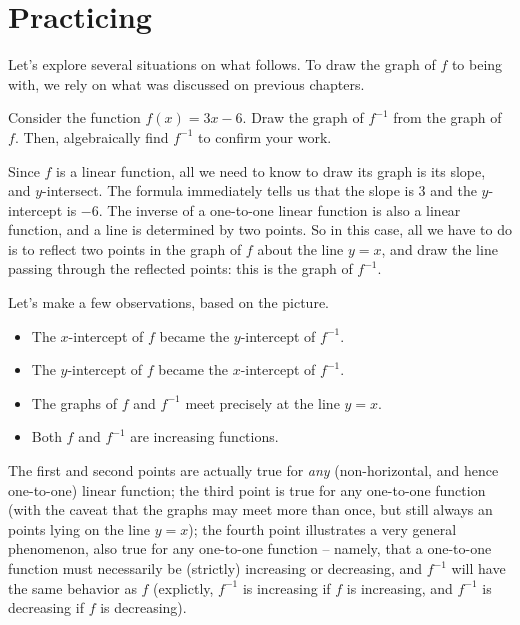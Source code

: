 \documentclass[nooutcomes]{ximera}
\begin{document}
\section{Practicing}

Let's explore several situations on what follows. To draw the graph of $f$ to being with, we rely on what was discussed on previous chapters.

\begin{example}
  Consider the function $f(x)=3x-6$. Draw the graph of $f^{-1}$ from the graph of $f$. Then, algebraically find $f^{-1}$ to confirm your work.
  
  \begin{explanation}
    Since $f$ is a linear function, all we need to know to draw its graph is its slope, and $y$-intersect. The formula immediately tells us that the slope is $3$ and the $y$-intercept is $-6$. The inverse of a one-to-one linear function is also a linear function, and a line is determined by two points. So in this case, all we have to do is to reflect two points in the graph of $f$ about the line $y=x$, and draw the line passing through the reflected points: this is the graph of $f^{-1}$.

    \begin{image}
    \end{image}
    Let's make a few observations, based on the picture.
    \begin{itemize}
    \item The $x$-intercept of $f$ became the $y$-intercept of $f^{-1}$.
    \item The $y$-intercept of $f$ became the $x$-intercept of $f^{-1}$.
    \item The graphs of $f$ and $f^{-1}$ meet precisely at the line $y=x$.
    \item Both $f$ and $f^{-1}$ are increasing functions.
    \end{itemize}
    The first and second points are actually true for \emph{any} (non-horizontal, and hence one-to-one) linear function; the third point is true for any one-to-one function (with the caveat that the graphs may meet more than once, but still always an points lying on the line $y=x$); the fourth point illustrates a very general phenomenon, also true for any one-to-one function -- namely, that a one-to-one function must necessarily be (strictly) increasing or decreasing, and $f^{-1}$ will have the same behavior as $f$ (explictly, $f^{-1}$ is increasing if $f$ is increasing, and $f^{-1}$ is decreasing if $f$ is decreasing).


\end{explanation}
\end{example}
\end{document}
